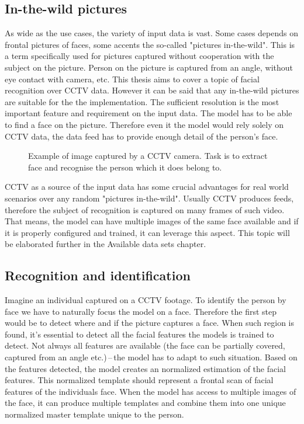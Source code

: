 \subsection{In-the-wild pictures}

As wide as the use cases, the variety of input data is vast. Some cases depends on frontal pictures of faces, some accents the so-called "pictures in-the-wild". This is a term specifically used for pictures captured without cooperation with the subject on the picture. Person on the picture is captured from an angle, without eye contact with camera, etc. This thesis aims to cover a topic of facial recognition over CCTV data. However it can be said that any in-the-wild pictures are suitable for the the implementation. The sufficient resolution is the most important feature and requirement on the input data. The model has to be able to find a face on the picture. Therefore even it the model would rely solely on CCTV data, the data feed has to provide enough detail of the person's face.

\begin{figure}
    \centering
    \caption{Example of image captured by a CCTV camera. Task is to extract face and recognise the person which it does belong to.}
\end{figure}

CCTV as a source of the input data has some crucial advantages for real world scenarios over any random "pictures in-the-wild". Usually CCTV produces feeds, therefore the subject of recognition is captured on many frames of such video. That means, the model can have multiple images of the same face available and if it is properly configured and trained, it can leverage this aspect. This topic will be elaborated further in the Available data sets chapter.

\subsection{Recognition and identification}

Imagine an individual captured on a CCTV footage. To identify the person by face we have to naturally focus the model on a face. Therefore the first step would be to detect where and if the picture captures a face. When such region is found, it's essential to detect all the facial features the models is trained to detect. Not always all features are available (the face can be partially covered, captured from an angle etc.)\,--\,the model has to adapt to such situation. Based on the features detected, the model creates an normalized estimation of the facial features. This normalized template should represent a frontal scan of facial features of the individuals face. When the model has access to multiple images of the face, it can produce multiple templates and combine them into one unique normalized master template unique to the person.

